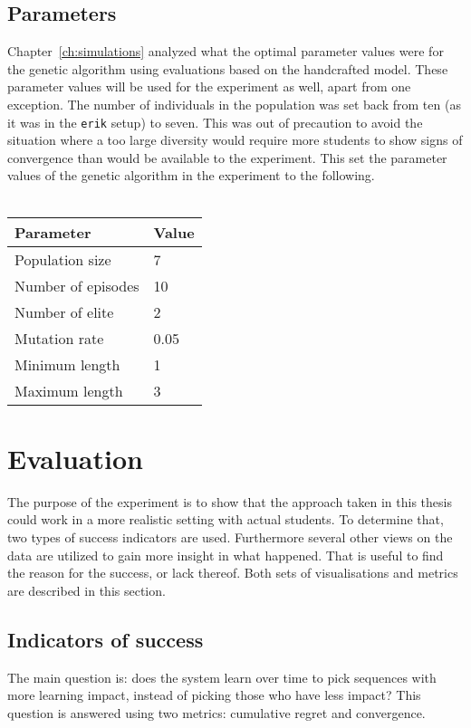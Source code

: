 \subsection{Parameters}
\label{sec:setup_params}
Chapter~\ref{ch:simulations} analyzed what the optimal parameter values were
for the genetic algorithm using evaluations based on the handcrafted model.
These parameter values will be used for the experiment as well, apart from one
exception. The number of individuals in the population was set back from ten
(as it was in the \texttt{erik} setup) to seven. This was out of precaution to
avoid the situation where a too large diversity would require more students to
show signs of convergence than would be available to the experiment. This set
the parameter values of the genetic algorithm in the experiment to the
following.\\\\
\begin{tabular}{ll}\hline
	\textbf{Parameter} &  \textbf{Value}\\\hline
	Population size & 7 \\
	Number of episodes & 10 \\
	Number of elite & 2 \\
	Mutation rate & 0.05 \\
	Minimum length & 1 \\
	Maximum length & 3 \\
\end{tabular}

\section{Evaluation}
The purpose of the experiment is to show that the approach taken in this thesis
could work in a more realistic setting with actual students. To determine that,
two types of success indicators are used. Furthermore several other views on
the data are utilized to gain more insight in what happened. That is useful to
find the reason for the success, or lack thereof. Both sets of visualisations
and metrics are described in this section.
\subsection{Indicators of success}
The main question is: does the system learn over time to pick sequences with
more learning impact, instead of picking those who have less impact? This
question is answered using two metrics: cumulative regret and convergence.
